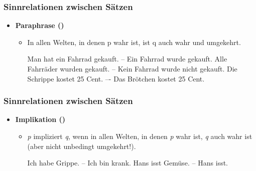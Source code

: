 
\begin{frame}
\frametitle{Sinnrelationen zwischen Sätzen}

\begin{itemize}
	\item \textbf{Paraphrase ()}
	
	\vspace{1em}
	
	\begin{itemize}
		\item In allen Welten, in denen p wahr ist, ist q auch wahr und umgekehrt.
		
		\eal 
			\ex Man hat ein Fahrrad gekauft. -- Ein Fahrrad wurde gekauft.
			\ex Alle Fahrräder wurden gekauft. -- Kein Fahrrad wurde nicht gekauft.
			\ex Die Schrippe kostet 25 Cent. –- Das Brötchen kostet 25 Cent.
		\zl
		
	\end{itemize}
	
\end{itemize}


\end{frame}




\begin{frame}
\frametitle{Sinnrelationen zwischen Sätzen}

\begin{itemize}
	\item \textbf{Implikation ()}
	
	\vspace{1em}
	
	\begin{itemize}
		\item \textit{p} impliziert \textit{q}, wenn in allen Welten, in denen \textit{p} wahr ist, \textit{q} auch wahr ist (aber nicht unbedingt umgekehrt!).
		
\vspace{1em}
		
		\eal 
			\ex Ich habe Grippe. -- Ich bin krank.
			\ex Hans isst Gemüse. -- Hans isst.
		\zl
			
		\end{itemize}
	
\end{itemize}


\end{frame}


